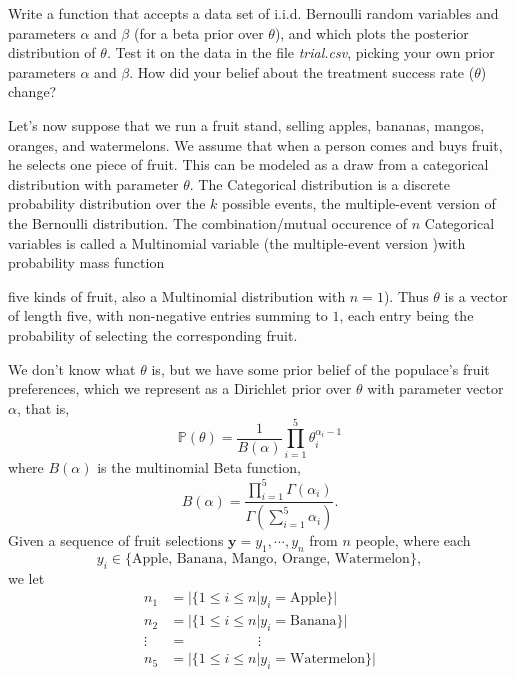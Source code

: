 \begin{problem}
Write a function that accepts a data set of i.i.d. Bernoulli random variables and parameters $\alpha$ and $\beta$ (for a beta prior over $\theta$), and which plots the posterior distribution of $\theta$. Test it on the data in the file \emph{trial.csv}, picking your own prior parameters $\alpha$ and $\beta$. How did your belief about the treatment success rate ($\theta$) change?
\end{problem}

Let's now suppose that we run a fruit stand, selling apples, bananas, mangos, oranges, and watermelons. We assume that when a person comes and buys fruit, he selects one piece of fruit. This can be modeled as a draw from a categorical distribution with parameter $\theta$. The Categorical distribution is a discrete probability distribution over the $k$ possible events, the multiple-event version of the Bernoulli distribution.  The combination/mutual occurence of $n$ Categorical variables is called a Multinomial variable (the multiple-event version )with probability mass function
$$$$

five kinds of fruit, also a Multinomial distribution with $n=1$). Thus $\theta$ is a vector of length five, with non-negative entries summing to $1$, each entry being the probability of selecting the corresponding fruit.

We don't know what $\theta$ is, but we have some prior belief of the populace's fruit preferences, which we represent as a Dirichlet prior over $\theta$ with parameter vector $\alpha$, that is, $$\mathbb{P}(\theta) = \frac{1}{B(\alpha)} \prod_{i=1}^{5} \theta_{i}^{\alpha_{i} - 1}$$ where $B(\alpha)$ is the multinomial Beta function, $$B(\alpha) = \frac{\prod_{i=1}^{5} \Gamma(\alpha_{i})}{\Gamma(\sum_{i=1}^{5} \alpha_{i})}.$$ Given a sequence of fruit selections $\mathbf{y} = y_{1}, \cdots, y_{n}$ from $n$ people, where each $$y_{i} \in \{\text{Apple, Banana, Mango, Orange, Watermelon}\},$$ we let 
\begin{align*}
n_{1} & = |\{1 \leq i \leq n | y_{i} = \text{Apple}\}| \\
n_{2} & = |\{1 \leq i \leq n | y_{i} = \text{Banana}\}| \\
\vdots & = \; \; \; \; \; \; \; \; \; \; \; \; \; \; \; \; \; \; \vdots \\
n_{5} & = |\{1 \leq i \leq n | y_{i} = \text{Watermelon}\}|
\end{align*}

